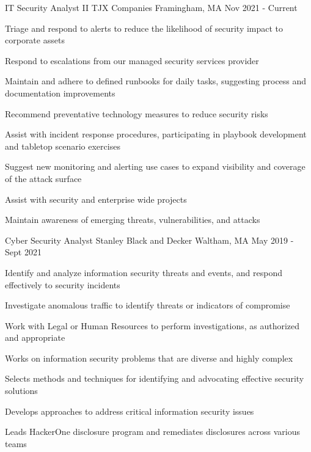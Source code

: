 
\begin{cventries}
  \cventry
    {IT Security Analyst II} %
    {TJX Companies} %
    {Framingham, MA} %
    {Nov 2021 - Current} %
    {
      \begin{cvitems} %
        \item {Triage and respond to alerts to reduce the likelihood of security impact to corporate assets}
        \item {Respond to escalations from our managed security services provider}
        \item {Maintain and adhere to defined runbooks for daily tasks, suggesting process and documentation improvements}
        \item {Recommend preventative technology measures to reduce security risks}
        \item {Assist with incident response procedures, participating in playbook development and tabletop scenario exercises}
        \item {Suggest new monitoring and alerting use cases to expand visibility and coverage of the attack surface}
        \item {Assist with security and enterprise wide projects}
        \item {Maintain awareness of emerging threats, vulnerabilities, and attacks}
      \end{cvitems}
    }

  \cventry
    {Cyber Security Analyst} %
    {Stanley Black and Decker} %
    {Waltham, MA} %
    {May 2019 - Sept 2021} %
    {
      \begin{cvitems} %
        \item {Identify and analyze information security threats and events, and respond effectively to security incidents}
        \item {Investigate anomalous traffic to identify threats or indicators of compromise}
        \item {Work with Legal or Human Resources to perform investigations, as authorized and appropriate}
        \item {Works on information security problems that are diverse and highly complex}
        \item {Selects methods and techniques for identifying and advocating effective security solutions}
        \item {Develops approaches to address critical information security issues}
        \item {Leads HackerOne disclosure program and remediates disclosures across various teams}
      \end{cvitems}
    }


\end{cventries}
